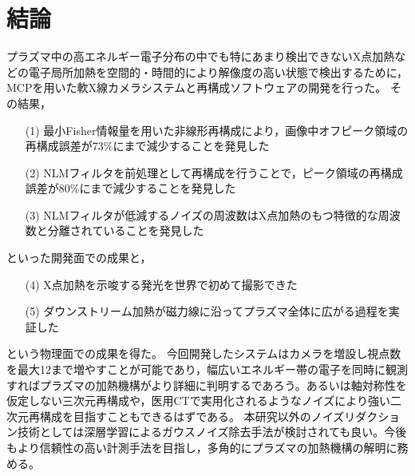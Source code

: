 \chapter{結論}
プラズマ中の高エネルギー電子分布の中でも特にあまり検出できないX点加熱などの電子局所加熱を空間的・時間的により解像度の高い状態で検出するために，MCPを用いた軟X線カメラシステムと再構成ソフトウェアの開発を行った。
その結果，
\begin{itemize}
  \item [(1)] 最小Fisher情報量を用いた非線形再構成により，画像中オフピーク領域の再構成誤差が73\%にまで減少することを発見した
  \item [(2)] NLMフィルタを前処理として再構成を行うことで，ピーク領域の再構成誤差が80\%にまで減少することを発見した
  \item [(3)] NLMフィルタが低減するノイズの周波数はX点加熱のもつ特徴的な周波数と分離されていることを発見した
\end{itemize}
といった開発面での成果と，
\begin{itemize}
  \item [(4)] X点加熱を示唆する発光を世界で初めて撮影できた
  \item [(5)] ダウンストリーム加熱が磁力線に沿ってプラズマ全体に広がる過程を実証した
\end{itemize}
という物理面での成果を得た。
今回開発したシステムはカメラを増設し視点数を最大12まで増やすことが可能であり，幅広いエネルギー帯の電子を同時に観測すればプラズマの加熱機構がより詳細に判明するであろう。あるいは軸対称性を仮定しない三次元再構成や，医用CTで実用化されるようなノイズにより強い二次元再構成を目指すこともできるはずである。
本研究以外のノイズリダクション技術としては深層学習によるガウスノイズ除去手法が検討されても良い。今後もより信頼性の高い計測手法を目指し，多角的にプラズマの加熱機構の解明に務める。